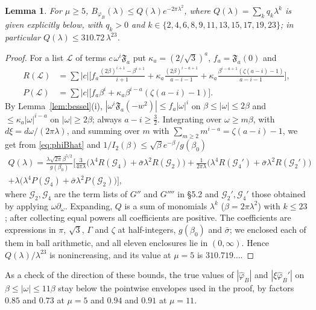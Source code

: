 \documentclass[11pt]{amsart}
\newtheorem{lemma}[proposition]{Lemma}
\theoremstyle{definition}
\theoremstyle{remark}
\numberwithin{equation}{section}
\newcommand{\F}{\mathfrak{F}}
\begin{document}
\begin{lemma}\label{lem:B7}
For $\mu\ge5$, $B_{\varphi_B}(\lambda)\le Q(\lambda)e^{-2\pi\lambda^2}$, where $Q(\lambda)=\sum_kq_k\lambda^k$ is given explicitly below, with $q_k>0$ and $k\in\{2,4,6,8,9,11,13,15,17,19,23\}$; in particular $Q(\lambda)\le310.72\,\lambda^{23}$.
\end{lemma}
\begin{proof}
For a list $\mathcal L$ of terms $c\,\omega^i\F_a$ put $\kappa_a=(2/\sqrt3)^a$, $f_a=\F_a(0)$ and
\begin{align*}
R(\mathcal L)&=\sum|c|\Big[f_a\frac{(2\beta)^{i+1}-\beta^{i+1}}{i+1}+\kappa_a\frac{(2\beta)^{i-a+1}}{a-i-1}+\kappa_a\frac{\beta^{i-a+1}(\zeta(a-i)-1)}{a-i-1}\Big],\\
P(\mathcal L)&=\sum|c|\Big[f_a\beta^i+\kappa_a\beta^{i-a}(\zeta(a-i)-1)\Big].
\end{align*}
By Lemma~\ref{lem:bessel}(i), $|\omega^i\F_a(-w^2)|\le f_a|\omega|^i$ on $\beta\le|\omega|\le2\beta$ and $\le\kappa_a|\omega|^{i-a}$ on $|\omega|\ge2\beta$; always $a-i\ge\frac32$. Integrating over $\omega\ge m\beta$, with $d\xi=d\omega/(2\pi\lambda)$, and summing over $m$ with $\sum_{m\ge2}m^{i-a}=\zeta(a-i)-1$, we get from \eqref{eq:phiBhat} and $1/I_2(\beta)\le\sqrt\beta e^{-\beta}/g(\beta_0)$
\begin{multline*}
Q(\lambda)=\frac{\lambda\sqrt{2\pi}\beta^{5/2}}{g(\beta_0)}\Big[\frac{3}{4\pi\lambda}\big(\lambda^4R(\mathcal G_4)+\bar\sigma\lambda^2R(\mathcal G_2)\big)+\frac{1}{2\pi\lambda}\big(\lambda^4R(\mathcal G_4')+\bar\sigma\lambda^2R(\mathcal G_2')\big)\\
+\lambda\big(\lambda^4P(\mathcal G_4)+\bar\sigma\lambda^2P(\mathcal G_2)\big)\Big],
\end{multline*}
where $\mathcal G_2,\mathcal G_4$ are the term lists of $G''$ and $G''''$ in \S5.2 and $\mathcal G_2',\mathcal G_4'$ those obtained by applying $\omega\partial_\omega$. Expanding, $Q$ is a sum of monomials $\lambda^k$ ($\beta=2\pi\lambda^2$) with $k\le23$; after collecting equal powers all coefficients are positive. The coefficients are expressions in $\pi$, $\sqrt3$, $\Gamma$ and $\zeta$ at half-integers, $g(\beta_0)$ and $\bar\sigma$; we enclosed each of them in ball arithmetic, and all eleven enclosures lie in $(0,\infty)$. Hence $Q(\lambda)/\lambda^{23}$ is nonincreasing, and its value at $\mu=5$ is $310.719\ldots$.
\end{proof}
As a check of the direction of these bounds, the true values of $|\hat\varphi_B|$ and $|\xi\hat\varphi_B'|$ on $\beta\le|\omega|\le11\beta$ stay below the pointwise envelopes used in the proof, by factors $0.85$ and $0.73$ at $\mu=5$ and $0.94$ and $0.91$ at $\mu=11$.
\end{document}
